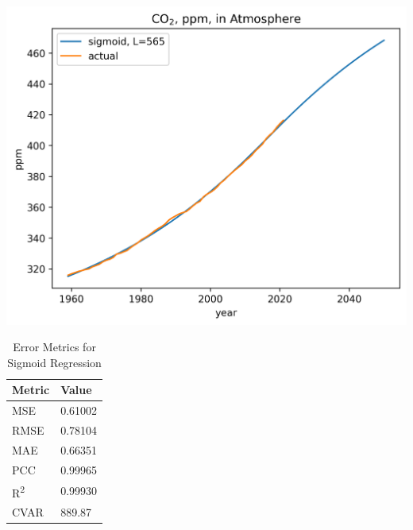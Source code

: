 \documentclass[12pt]{mcmthesis}
\begin{document}
    \begin{table}[h]
        \begin{minipage}{0.7\linewidth}
            \centering
            \includegraphics[width=\textwidth]{co2_sigm_565}%
            \label{fig:co2_logi}
        \end{minipage}%
        \begin{minipage}{0.3\linewidth}
            \centering
            \begin{tabular}{ll}
                \toprule
                Metric               & Value   \\
                \midrule
                MSE                  & 0.61002 \\
                RMSE                 & 0.78104 \\
                MAE                  & 0.66351 \\
                PCC                  & 0.99965 \\
                R\textsuperscript{2} & 0.99930 \\
                CVAR                 & 889.87  \\
                \bottomrule
            \end{tabular}
            \vspace{8pt}
            \caption{Error Metrics for Sigmoid Regression}
            \label{tab:co2_logi_err}
        \end{minipage}
    \end{table}
\end{document}

